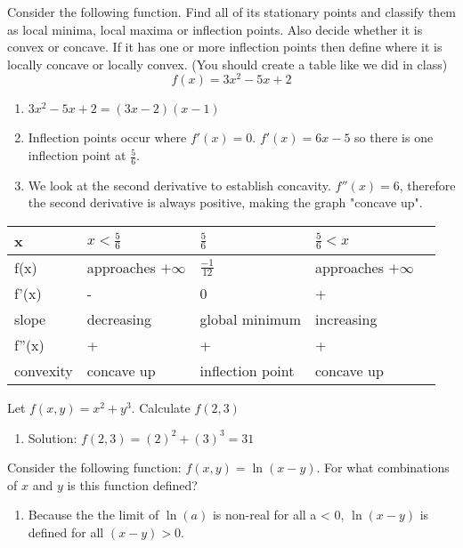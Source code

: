 \documentclass[10pt]{article}
\newenvironment{problem}[2][Problem]{\begin{trivlist}
\item[\hskip \labelsep {\bfseries #1}\hskip \labelsep {\bfseries #2.}]}{\end{trivlist}}
\begin{document}
\begin{problem}{3.7}
Consider the following function. Find all of its stationary points and classify them as local minima, local maxima or inflection points. Also decide whether it is convex or concave. If it has one or more inflection points then define where it is locally concave or locally convex. (You should create a table like we did in class)
$$f(x)=3x^2-5x+2$$

\begin{enumerate}
    \item $3x^2-5x+2 = (3x - 2)(x - 1)$
    \item Inflection points occur where $f'(x) = 0$. $f'(x) = 6x - 5$ so there is one inflection point at $\frac{5}{6}$.
    \item We look at the second derivative to establish concavity. $f''(x) = 6$, therefore the second derivative is always positive, making the graph "concave up".
\end{enumerate}

\begin{tabular}{lllll}
\hline
x         & $x<\frac{5}{6}$      & $\frac{5}{6}$    & $\frac{5}{6}<x$      &  \\ \hline
\endfirsthead
%
\endhead
%
f(x)      & approaches $+\infty$ & $\frac{-1}{12}$  & approaches $+\infty$ &  \\
f'(x)     & -                    & 0                & +                    &  \\
slope     & decreasing           & global minimum   & increasing           &  \\
f''(x)    & +                    & +                & +                    &  \\
convexity & concave up           & inflection point & concave up           & 
\end{tabular}

\end{problem}

\begin{problem}{3.8}
Let $f(x,y)=x^2+y^3$. Calculate $f(2,3)$

\begin{enumerate}
    \item Solution: $f(2,3) = (2)^2 + (3)^3 = 31$
\end{enumerate}
\end{problem}

\begin{problem}{3.9}
Consider the following function: $f(x,y)=\ln(x-y)$. For what combinations of $x$ and $y$ is this function defined?

\begin{enumerate}
    \item Because the the limit of $\ln(a)$ is non-real for all a < 0, $\ln(x-y)$ is defined for all $(x-y) > 0$.
\end{enumerate}

\end{problem}
\end{document}
